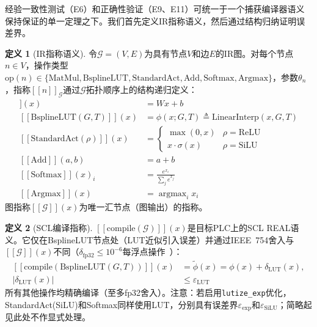 \documentclass[journal,onecolumn]{IEEEtran}
\newcommand{\llbracket}{[\![}
\newcommand{\rrbracket}{]\!]}
\theoremstyle{definition}
\newtheorem{definition}{定义}
\theoremstyle{plain}
\theoremstyle{remark}
\begin{document}
经验一致性测试（E6）和正确性验证（E9、E11）可统一于一个捕获编译器语义保持保证的单一定理之下。我们首先定义IR指称语义，然后通过结构归纳证明误差界。

\begin{definition}[IR指称语义]
\label{def:ir_semantics}
令$\mathcal{G} = (V, E)$为具有节点$V$和边$E$的IR图。对每个节点$n \in V$，操作类型$\text{op}(n) \in \{\text{MatMul}, \text{BsplineLUT}, \text{StandardAct}, \text{Add}, \text{Softmax}, \text{Argmax}\}$，参数$\theta_n$，指称$\llbracket n \rrbracket_{\mathcal{G}}$通过$\mathcal{G}$拓扑顺序上的结构递归定义：
\begin{align}
\llbracket\text{MatMul}(W,b)\rrbracket(x) &= Wx + b \\
\llbracket\text{BsplineLUT}(G,T)\rrbracket(x) &= \phi(x; G, T) \triangleq \text{LinearInterp}(x, G, T) \\
\llbracket\text{StandardAct}(\rho)\rrbracket(x) &=
\begin{cases} \max(0,x) & \rho = \text{ReLU} \\ x \cdot \sigma(x) & \rho = \text{SiLU} \end{cases} \\
\llbracket\text{Add}\rrbracket(a, b) &= a + b \\
\llbracket\text{Softmax}\rrbracket(x)_i &= \frac{e^{x_i}}{\sum_j e^{x_j}} \\
\llbracket\text{Argmax}\rrbracket(x) &= \operatorname{argmax}_i x_i
\end{align}
图指称$\llbracket\mathcal{G}\rrbracket(x)$为唯一汇节点（图输出）的指称。
\end{definition}

\begin{definition}[SCL编译指称]
\label{def:scl_denotation}
$\llbracket\text{compile}(\mathcal{G})\rrbracket(x)$是目标PLC上的SCL REAL语义。它仅在BsplineLUT节点处（LUT近似引入误差）并通过IEEE~754舍入与$\llbracket\mathcal{G}\rrbracket(x)$不同（$\delta_{\text{fp32}} \leq 10^{-6}$每浮点操作~\cite{paszke2019pytorch}）：
\begin{equation}
\begin{aligned}
\llbracket\text{compile}(\text{BsplineLUT}(G,T))\rrbracket(x) &=
\tilde{\phi}(x) = \phi(x) + \delta_{\text{LUT}}(x), \\
|\delta_{\text{LUT}}(x)| &\leq \varepsilon_{\text{LUT}}
\end{aligned}
\label{eq:lut_error_def}
\end{equation}
所有其他操作均精确编译（至多fp32舍入）。注意：若启用\texttt{lutize\_exp}优化，StandardAct(SiLU)和Softmax同样使用LUT，分别具有误差界$\varepsilon_{\text{exp}}$和$\varepsilon_{\text{SiLU}}$；简略起见此处不作显式处理。
\end{definition}
\end{document}
